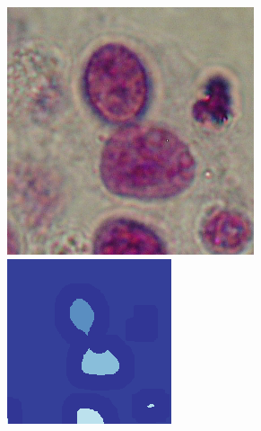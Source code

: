 \begin{figure}[b!]
	\centering	
	\includegraphics[width=0.97\linewidth]{Figures/Chapter2/6a1.png}
	\includegraphics[width=0.97\linewidth]{Figures/Chapter2/6b1.png}

\end{figure}
